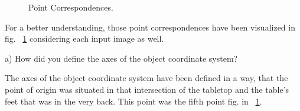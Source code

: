 \documentclass[a4paper,headings=small]{scrartcl}
\numberwithin{equation}{section} %
\numberwithin{figure}{section}   %
\newcommand{\generatedImgRootImg}{../resources/img}
\begin{document}
\begin{figure}
   \hfill
   \hfill
  \caption{Point Correspondences.}
  \label{fig:Point Correspondences}
\end{figure}

For a better understanding, those point correspondences have been 
visualized in fig. ~\ref{fig:Point Correspondences}
considering each input image as well.

a) How did you define the axes of the object coordinate system?

The axes of the object coordinate system have been defined in a way,
that the point of origin was situated in that intersection of the tabletop and the table's feet
that was in the very back. This point was the fifth point fig. in ~\ref{fig:Point Correspondences}.
\end{document}
